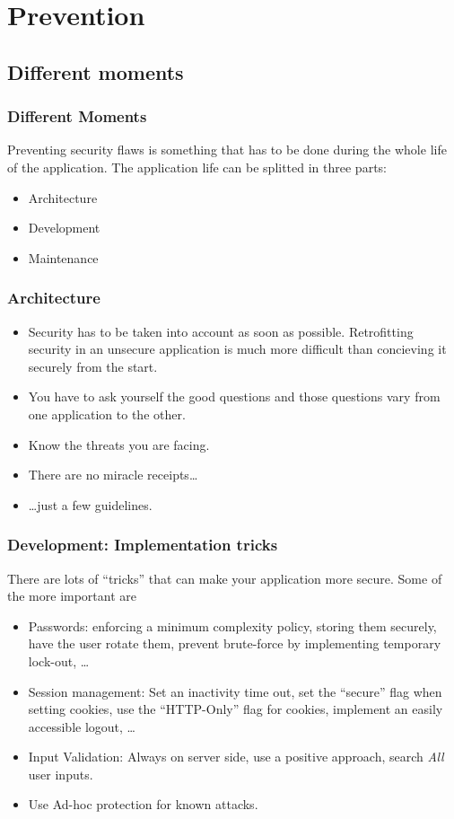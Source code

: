 \section{Prevention}
\subsection{Different moments}
\begin{frame}
\frametitle{Different Moments}

Preventing security flaws is something that has to be done during the
whole life of the application. The application life can be splitted in
three parts:

\begin{itemize}
\item Architecture
\item Development
\item Maintenance
\end{itemize}
\end{frame}

\begin{frame}
\frametitle{Architecture}
\begin{itemize}
\item Security has to be taken into account as soon as
  possible. Retrofitting security in an unsecure application is much
  more difficult than concieving it securely from the start.
\item You have to ask yourself the good questions and those questions
  vary from one application to the other.
\item Know the threats you are facing.
\item There are no miracle receipts\ldots
\item \ldots just a few guidelines.
\end{itemize}
\end{frame}

\begin{frame}
\frametitle{Development: Implementation tricks}

There are lots of ``tricks'' that can make your application more
secure. Some of the more important are

\begin{itemize}
\item Passwords: enforcing a minimum complexity policy, storing them
  securely, have the user rotate them, prevent brute-force by
  implementing temporary lock-out, \ldots
\item Session management: Set an inactivity time out, set the
  ``secure'' flag when setting cookies, use the ``HTTP-Only'' flag for
  cookies, implement an easily accessible logout, \ldots
\item Input Validation: Always on server side, use a positive
  approach, search \emph{All} user inputs.
\item Use Ad-hoc protection for known attacks.
\end{itemize}
\end{frame}


